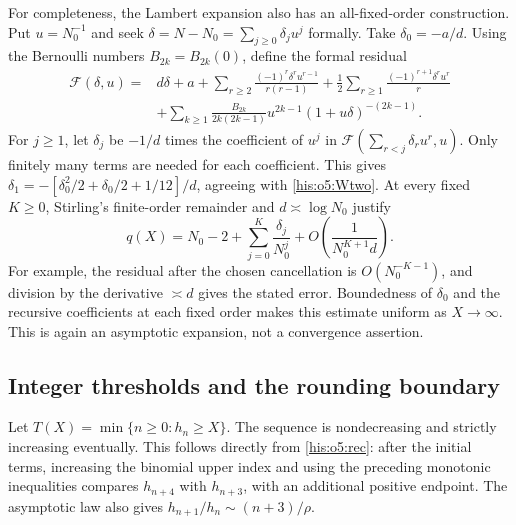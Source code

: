 \documentclass[11pt]{article}
\theoremstyle{remark}\newtheorem{remark}[theorem]{Remark}
\numberwithin{equation}{section}
\begin{document}
For completeness, the Lambert expansion also has an all-fixed-order
construction. Put $u=N_0^{-1}$ and seek
$\delta=N-N_0=\sum_{j\ge0}\delta_j u^j$ formally. Take $\delta_0=-a/d$.
Using the Bernoulli numbers $B_{2k}=B_{2k}(0)$, define the formal residual
\begin{align*}
\mathcal F(\delta,u)={}&d\delta+a
+\sum_{r\ge2}\frac{(-1)^r\delta^r u^{r-1}}{r(r-1)}
+\frac12\sum_{r\ge1}\frac{(-1)^{r+1}\delta^r u^r}{r}\\
&+\sum_{k\ge1}\frac{B_{2k}}{2k(2k-1)}
 u^{2k-1}(1+u\delta)^{-(2k-1)}.
\end{align*}
For $j\ge1$, let $\delta_j$ be $-1/d$ times the coefficient of $u^j$
in $\mathcal F(\sum_{r<j}\delta_ru^r,u)$. Only finitely many terms are
needed for each coefficient. This gives
$\delta_1=-[\delta_0^2/2+\delta_0/2+1/12]/d$, agreeing with
\eqref{his:o5:Wtwo}. At every fixed $K\ge0$, Stirling's finite-order remainder
and $d\asymp\log N_0$ justify
\begin{equation}\label{his:o5:Wall}
q(X)=N_0-2+\sum_{j=0}^{K}\frac{\delta_j}{N_0^j}
+O\!\left(\frac1{N_0^{K+1}d}\right).
\end{equation}
For example, the residual after the chosen cancellation is
$O(N_0^{-K-1})$, and division by the derivative $\asymp d$ gives the
stated error. Boundedness of $\delta_0$ and the recursive coefficients
at each fixed order makes this estimate uniform as $X\to\infty$.
This is again an asymptotic expansion, not a convergence assertion.

\subsection{Integer thresholds and the rounding boundary}
Let $T(X)=\min\{n\ge0:h_n\ge X\}$. The sequence is nondecreasing and
strictly increasing eventually. This follows directly from
\eqref{his:o5:rec}: after the initial terms, increasing the binomial upper index
and using the preceding monotonic inequalities compares $h_{n+4}$ with
$h_{n+3}$, with an additional positive endpoint. The asymptotic law also
gives $h_{n+1}/h_n\sim(n+3)/\rho$.
\end{document}
